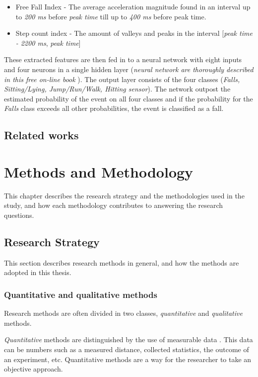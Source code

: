 \documentclass[12pt, a4paper, onecolumn]{article}
\begin{document}
\begin{itemize}
		\item{Free Fall Index} - The average acceleration magnitude found in an interval up to \textit{200 ms} before \textit{peak time} till up to \textit{400 ms} before peak time.
		
		\item{Step count index} - The amount of valleys and peaks in the interval [\textit{peak time - 2200 ms}, \textit{peak time}]
	\end{itemize}
	
	These extracted features are then fed in to a neural network with eight inputs and four neurons in a single hidden layer (\textit{neural network are thoroughly described in this free on-line book}  \cite{neural_networks}). The output layer consists of the four classes (\textit{Falls, Sitting/Lying, Jump/Run/Walk, Hitting sensor}). The network outpost the estimated probability of the event on all four classes and if the probability for the \textit{Falls}  class exceeds all other probabilities, the event is classified as a fall.
	
	\subsection{Related works}
	
	\newpage
	\section{Methods and Methodology}
	
	This chapter describes the research strategy and the methodologies used in the study, and how each methodology contributes to answering the research questions.
	
	\subsection{Research Strategy}
	
	This section describes research methods in general, and how the methods are adopted in this thesis.
	
	\subsubsection{Quantitative and qualitative methods}
	
	Research methods are often divided in two classes, \textit{quantitative} and \textit{qualitative} methods.
	
	\textit{Quantitative} methods are distinguished by the use of measurable data \cite[p~54]{borrego}. This data can be numbers such as a measured distance, collected statistics, the outcome of an experiment, etc. Quantitative methods are a way for the researcher to take an objective approach.
	
\end{document}
